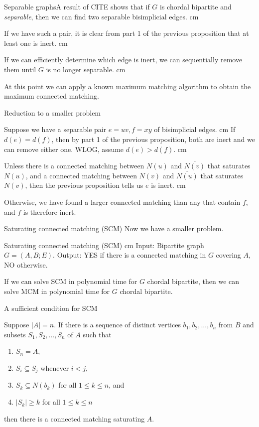 \documentclass{beamer}
\newcommand{\bframe}[2]{\begin{frame}{#1}#2\end{frame}}
\begin{document}
\bframe{Separable graphs}{A result of CITE shows that if $G$ is chordal bipartite and {\it separable}, then we can find two separable bisimplicial edges.  \pause\vskip 0.5 cm

If we have such a pair, it is clear from part 1 of the previous proposition that at least one is inert. \pause\vskip 0.5 cm

If we can efficiently determine which edge is inert, we can sequentially remove them until $G$ is no longer separable. \pause \vskip 0.5 cm

At this point we can apply a known maximum matching algorithm to obtain the maximum connected matching.
 }

\bframe{Reduction to a smaller problem}{

Suppose we have a separable pair $e = uv, f = xy$ of bisimplicial edges.\pause\vskip 0.5 cm
If $d(e) = d(f)$, then by part 1 of the previous proposition, both are inert and we can remove either one. \pause WLOG, assume $d(e) > d(f)$.  \pause \vskip 0.5 cm

Unless there is a connected matching between $N(u)$ and $\overline{N(v)}$ that saturates $N(u)$, and a connected matching between $N(v)$ and $\overline{N(u)}$ that saturates $N(v)$, then the previous proposition tells us $e$ is inert.\pause\vskip 0.5 cm

Otherwise, we have found a larger connected matching than any that contain $f$, and $f$ is therefore inert.

}

\bframe{Saturating connected matching (SCM)}{
Now we have a smaller problem. \pause
\begin{framed}
  		Saturating connected matching (SCM)
  		\vskip 0.25 cm Input: Bipartite graph $G = (A, B;E)$.
  		\newline Output: YES if there is a connected matching in $G$ covering $A$, NO otherwise.
 	\end{framed}\pause

If we can solve SCM in polynomial time for $G$ chordal bipartite, then we can solve MCM in polynomial time for $G$ chordal bipartite.
}

\bframe{A sufficient condition for SCM}{
 
Suppose $|A| =n$.  If there is a sequence of distinct vertices $b_1, b_2, \ldots, b_n$ from $B$ and subsets $S_1, S_2, \ldots ,S_n$ of $A$ such that
	\begin{enumerate} 
		\item $S_n = A$, 
		\item $S_i \subseteq S_j$ whenever $i < j$, 
		\item $S_k \subseteq N(b_k)$ for all $1 \leq k \leq n$, and
		\item $|S_k| \geq k$ for all $1 \leq k \leq n$
	\end{enumerate}
then there is a connected matching saturating $A$.
}
\end{document}
